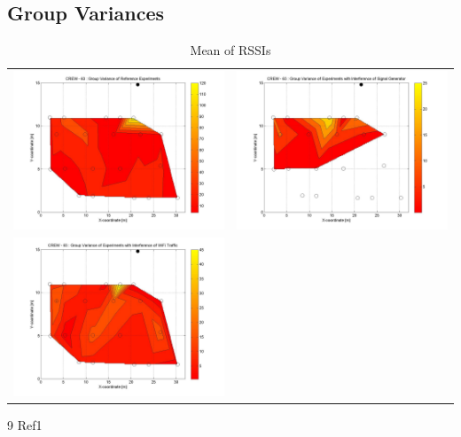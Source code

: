 \documentclass[11pt,a4paper,headinclude,footinclude,chapterprefix=on]{scrreprt}
\begin{document}
\subsection{Group Variances}
\begin{table}
	[h] \centering \caption{Mean of RSSIs} 
	\label{tb:63:group:variance} 
	\begin{tabular}
		{|l|l|} \hline 
		\includegraphics[width=8cm]{../../Source/plot/CREW_63/63_Ref_Group_Variance.jpg} & 		\includegraphics[width=8cm]{../../Source/plot/CREW_63/63_Sig_Group_Variance.jpg} \\
		\includegraphics[width=8cm]{../../Source/plot/CREW_63/63_Wifi_Group_Variance.jpg} & \\
		\hline
	\end{tabular}
\end{table}
\pagebreak 

\begin{thebibliography}
	{9}  Ref1 
\end{thebibliography}
\end{document}
